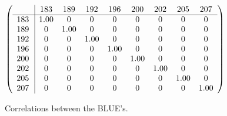 \begin{table}[H]
\scriptsize
\begin{center}
\renewcommand{\arraystretch}{1.1}
\begin{math}\left(\begin{array}{c|cccccccc}
 & \mathrm{183} & 
\mathrm{189} & 
\mathrm{192} & 
\mathrm{196} & 
\mathrm{200} & 
\mathrm{202} & 
\mathrm{205} & 
\mathrm{207} \\
\hline
\mathrm{183} \hspace*{2pt} &       1.00 &  0 &  0 &  0 &  0 &  0 &  0 &  0 \\
\mathrm{189} \hspace*{2pt} &  0 &       1.00 &  0 &  0 &  0 &  0 &  0 &  0 \\
\mathrm{192} \hspace*{2pt} &  0 &  0 &       1.00 &  0 &  0 &  0 &  0 &  0 \\
\mathrm{196} \hspace*{2pt} &  0 &  0 &  0 &       1.00 &  0 &  0 &  0 &  0 \\
\mathrm{200} \hspace*{2pt} &  0 &  0 &  0 &  0 &       1.00 &  0 &  0 &  0 \\
\mathrm{202} \hspace*{2pt} &  0 &  0 &  0 &  0 &  0 &       1.00 &  0 &  0 \\
\mathrm{205} \hspace*{2pt} &  0 &  0 &  0 &  0 &  0 &  0 &       1.00 &  0 \\
\mathrm{207} \hspace*{2pt} &  0 &  0 &  0 &  0 &  0 &  0 &  0 &       1.00 \\
\end{array}\right)\end{math}
\caption{Correlations between the BLUE's.}
\renewcommand{\arraystretch}{1}
\end{center}
\end{table}
